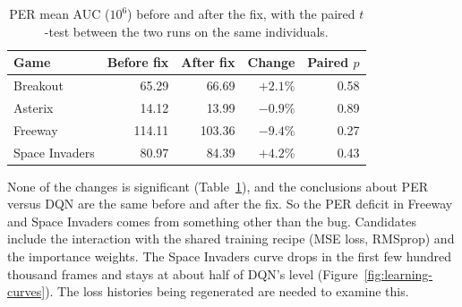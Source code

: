 \documentclass[11pt,a4paper]{article}
\begin{document}
\begin{table}[htbp]
    \centering
    \caption{PER mean AUC ($10^6$) before and after the fix, with the paired
    $t$-test between the two runs on the same individuals.}
    \label{tab:per-fix}
    \small
    \begin{tabular}{lrrrr}
        \toprule
        Game & Before fix & After fix & Change & Paired $p$ \\
        \midrule
        Breakout & 65.29 & 66.69 & $+2.1\%$ & 0.58 \\
        Asterix & 14.12 & 13.99 & $-0.9\%$ & 0.89 \\
        Freeway & 114.11 & 103.36 & $-9.4\%$ & 0.27 \\
        Space Invaders & 80.97 & 84.39 & $+4.2\%$ & 0.43 \\
        \bottomrule
    \end{tabular}
\end{table}

None of the changes is significant (Table~\ref{tab:per-fix}), and the
conclusions about PER versus DQN are the same before and after the fix. So
the PER deficit in Freeway and Space Invaders comes from something other
than the bug. Candidates include the interaction with the shared training
recipe (MSE loss, RMSprop) and the importance weights. The Space Invaders curve drops in the first few hundred thousand
frames and stays at about half of DQN's level
(Figure~\ref{fig:learning-curves}). The loss histories being regenerated
are needed to examine this.
\end{document}
